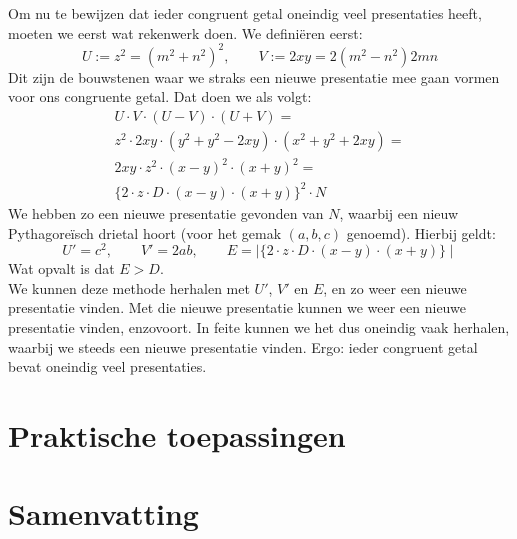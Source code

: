 \documentclass[12pt,reqno]{article}
\theoremstyle{theorem}
\theoremstyle{definition}
\begin{document}
	Om nu te bewijzen dat ieder congruent getal oneindig veel presentaties heeft, moeten we eerst wat rekenwerk doen. We defini\"eren eerst:
	\begin{equation}
		U:= z^2=(m^2+n^2)^2, \qquad V:= 2xy=2(m^2-n^2)2mn
	\end{equation}
	Dit zijn de bouwstenen waar we straks een nieuwe presentatie mee gaan vormen voor ons congruente getal. Dat doen we als volgt:
	\begin{align}
			U\cdot V \cdot (U-V) \cdot (U+V)=\\
			z^2\cdot 2xy\cdot (y^2+y^2-2xy)\cdot (x^2+y^2+2xy)=\\
			2xy\cdot z^2\cdot (x-y)^2\cdot (x+y)^2=\\
			\{2\cdot z\cdot D\cdot (x-y)\cdot (x+y)\}^2\cdot N
	\end{align}
	We hebben zo een nieuwe presentatie gevonden van $N$, waarbij een nieuw Pythagore\"isch drietal hoort (voor het gemak $(a,b,c)$ genoemd). Hierbij geldt:
	\begin{equation}
		U'=c^2, \qquad V'=2ab, \qquad E= \mid \{2\cdot z\cdot D\cdot (x-y)\cdot (x+y)\} \mid
	\end{equation}
	Wat opvalt is dat $E>D$.\\
	
	We kunnen deze methode herhalen met $U'$, $V'$ en $E$, en zo weer een nieuwe presentatie vinden. Met die nieuwe presentatie kunnen we weer een nieuwe presentatie vinden, enzovoort. In feite kunnen we het dus oneindig vaak herhalen, waarbij we steeds een nieuwe presentatie vinden. Ergo: ieder congruent getal bevat oneindig veel presentaties.
	
	
	\section{Praktische toepassingen}
	
	
	\section{Samenvatting}
	
	
	
	
\end{document}
